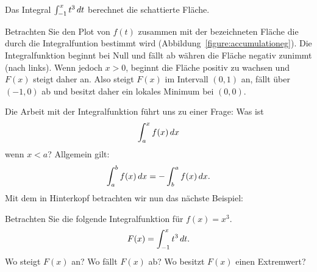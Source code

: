\begin{marginfigure}
\caption{Das Integral $\int_{-1}^x t^3 \, d t$ berechnet die schattierte Fläche.}
\label{figure:accumulationeg}
\end{marginfigure}

\begin{solution}
Betrachten Sie den Plot von $f(t)$ zusammen mit der bezeichneten Fläche die durch die Integralfuntion bestimmt wird (Abbildung~\ref{figure:accumulationeg}). Die Integralfunktion beginnt bei Null und fällt ab währen die Fläche negativ zunimmt (nach links). Wenn jedoch  $x>0$, beginnt die Fläche positiv zu wachsen und $F(x)$ steigt daher an. Also steigt
$F(x)$ im Intervall $(0,1)$ an, fällt über $(-1,0)$ ab und besitzt daher ein lokales Minimum bei $(0,0)$.
\end{solution}

Die Arbeit mit der Integralfunktion führt uns zu einer Frage: Was ist
\[
\int_a^x f(x) \, d x
\]
wenn $x< a$? Allgemein gilt:
\[
\int_a^b f(x) \, d x = -\int_b^a f(x) \, d x. 
\]
Mit dem in Hinterkopf betrachten wir nun das nächste Beispiel:


\begin{example} 
Betrachten Sie die folgende Integralfunktion für $f(x) = x^3$.
\[
F(x) = \int_{-1}^x t^3 \, d t.
\]
Wo steigt $F(x)$ an? Wo fällt $F(x)$ ab? Wo besitzt
$F(x)$ einen Extremwert?
\end{example}


